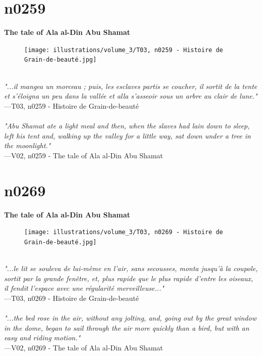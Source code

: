 \documentclass[../Carre_nights.tex]{subfiles}
\begin{document}
\newpage

\section{n0259}
\textbf{\Large{The tale of Ala al-Din Abu Shamat}} \\

\begin{figure}[ht]
\centering
\texttt{[image: illustrations/volume\_3/T03, n0259 - Histoire de Grain-de-beauté.jpg]}
\end{figure}

\textit{\\
"...il mangea un morceau ; puis, les esclaves partis se coucher, il sortit de la tente et s’éloigna un peu dans la vallée et alla s’asseoir sous un arbre au clair de lune."} \\
—T03, n0259 - Histoire de Grain-de-beauté \\~\\
\textit{"Abu Shamat ate a light meal and then, when the slaves had lain down to sleep, left his tent and, walking up the valley for a little way, sat down under a tree in the moonlight."} \\
—V02, n0259 - The tale of Ala al-Din Abu Shamat

\newpage

\section{n0269}
\textbf{\Large{The tale of Ala al-Din Abu Shamat}} \\

\begin{figure}[ht]
\centering
\texttt{[image: illustrations/volume\_3/T03, n0269 - Histoire de Grain-de-beauté.jpg]}
\end{figure}

\textit{\\
"...le lit se souleva de lui-même en l’air, sans secousses, monta jusqu’à la coupole, sortit par la grande fenêtre, et, plus rapide que le plus rapide d’entre les oiseaux, il fendit l’espace avec une régularité merveilleuse..."} \\
—T03, n0269 - Histoire de Grain-de-beauté \\~\\
\textit{"...the bed rose in the air, without any jolting, and, going out by the great window in the dome, began to sail through the air more quickly than a bird, but with an easy and riding motion."} \\
—V02, n0269 - The tale of Ala al-Din Abu Shamat
\end{document}
